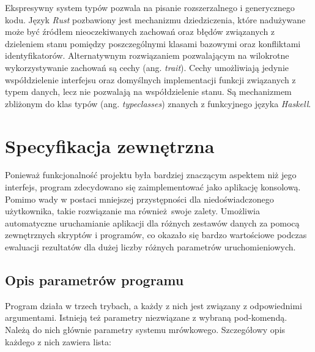 {    Ekspresywny system typów pozwala na pisanie rozszerzalnego i generycznego kodu. Język \textit{Rust} pozbawiony jest
    mechanizmu dziedziczenia, które nadużywane może być źródłem nieoczekiwanych zachowań oraz błędów związanych z
    dzieleniem stanu pomiędzy poszczególnymi klasami bazowymi oraz konfliktami identyfikatorów. Alternatywnym
    rozwiązaniem pozwalającym na wilokrotne wykorzystywanie zachowań są cechy (ang. \textit{trait}). Cechy umożliwiają
    jedynie współdzielenie interfejsu oraz domyślnych implementacji funkcji związanych z typem danych, lecz nie
    pozwalają na współdzielenie stanu. Są mechanizmem zbliżonym do klas typów (ang. \textit{typeclasses}) znanych z
    funkcyjnego języka \textit{Haskell}.


    \section{Specyfikacja zewnętrzna}
    {
        Ponieważ funkcjonalność projektu była bardziej znaczącym aspektem niż jego interfejs, program zdecydowano się
        zaimplementować jako aplikację konsolową. Pomimo wady w postaci mniejszej przystępności dla niedoświadczonego
        użytkownika, takie rozwiązanie ma również swoje zalety. Umożliwia automatyczne uruchamianie aplikacji dla
        różnych zestawów danych za pomocą zewnętrznych skryptów i programów, co okazało się bardzo wartościowe podczas
        ewaluacji rezultatów dla dużej liczby różnych parametrów uruchomieniowych.

        \subsection{Opis parametrów programu}
        {
            Program działa w trzech trybach, a każdy z nich jest związany z odpowiednimi argumentami. Istnieją też
            parametry niezwiązane z wybraną pod-komendą. Należą do nich głównie parametry systemu mrówkowego.
            Szczegółowy opis każdego z nich zawiera lista:

}}}
